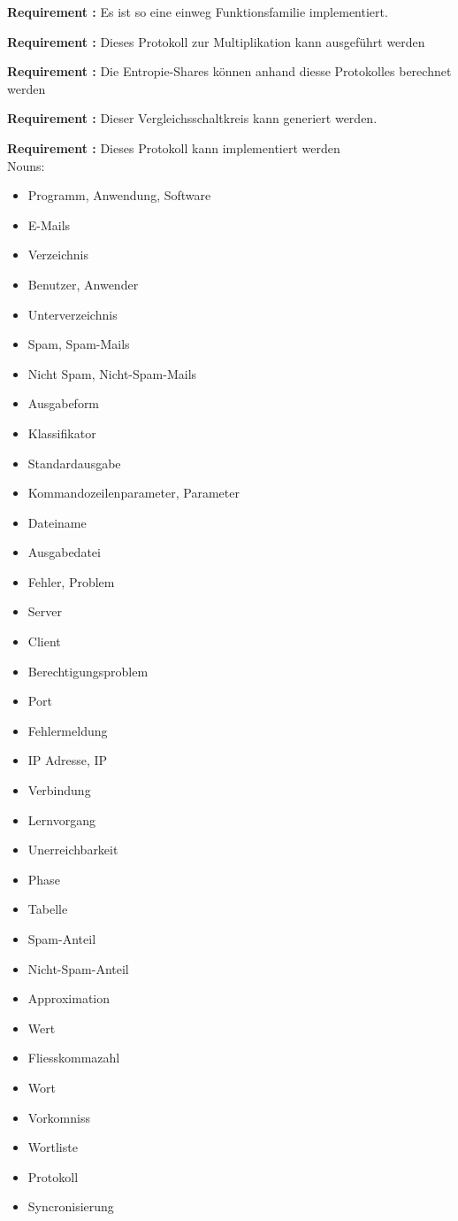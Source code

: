 \documentclass{article}
\newcounter{requirementscount}{}
\newcommand{\requirement}[1] {
        \addtocounter{requirementscount}{1}
        {\bf Requirement \therequirementscount:} #1\\
    }
\begin{document}
\requirement{Es ist so eine einweg Funktionsfamilie implementiert.}
\requirement{Dieses Protokoll zur Multiplikation kann ausgef\"uhrt werden}

\requirement{Die Entropie-Shares k\"onnen anhand diesse Protokolles berechnet
werden}
\requirement{Dieser Vergleichsschaltkreis kann generiert werden.}
\requirement{Dieses Protokoll kann implementiert werden}
\pagebreak
Nouns:
\begin{multicols}{2}
\begin{itemize}
\item Programm, Anwendung, Software
\item E-Mails
\item Verzeichnis
\item Benutzer, Anwender
\item Unterverzeichnis
\item Spam, Spam-Mails
\item Nicht Spam, Nicht-Spam-Mails
\item Ausgabeform
\item Klassifikator
\item Standardausgabe
\item Kommandozeilenparameter, Parameter
\item Dateiname
\item Ausgabedatei
\item Fehler, Problem
\item Server
\item Client
\item Berechtigungsproblem
\item Port
\item Fehlermeldung
\item IP Adresse, IP
\item Verbindung
\item Lernvorgang
\item Unerreichbarkeit
\item Phase
\item Tabelle
\item Spam-Anteil
\item Nicht-Spam-Anteil
\item Approximation
\item Wert
\item Fliesskommazahl
\item Wort
\item Vorkomniss
\item Wortliste
\item Protokoll
\item Syncronisierung

\end{itemize}
\end{multicols}
\end{document}

